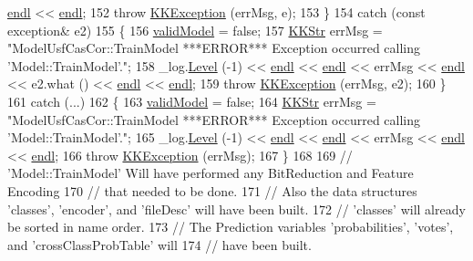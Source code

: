 \begin{DoxyCode}
      \hyperlink{namespace_k_k_b_ad1f50f65af6adc8fa9e6f62d007818a8}{endl} << \hyperlink{namespace_k_k_b_ad1f50f65af6adc8fa9e6f62d007818a8}{endl};
152     \textcolor{keywordflow}{throw}  \hyperlink{class_k_k_b_1_1_k_k_exception}{KKException} (errMsg, e);
153   \}
154   \textcolor{keywordflow}{catch} (\textcolor{keyword}{const} exception& e2)
155   \{
156     \hyperlink{class_k_k_m_l_l_1_1_model_af881a051b703412686fa3b4a62b6d68a}{validModel} = \textcolor{keyword}{false};
157     \hyperlink{class_k_k_b_1_1_k_k_str}{KKStr} errMsg = \textcolor{stringliteral}{"ModelUsfCasCor::TrainModel  ***ERROR*** Exception occurred calling
       'Model::TrainModel'."};
158     \_log.\hyperlink{class_k_k_b_1_1_run_log_a32cf761d7f2e747465fd80533fdbb659}{Level} (-1) << \hyperlink{namespace_k_k_b_ad1f50f65af6adc8fa9e6f62d007818a8}{endl} << \hyperlink{namespace_k_k_b_ad1f50f65af6adc8fa9e6f62d007818a8}{endl} << errMsg << \hyperlink{namespace_k_k_b_ad1f50f65af6adc8fa9e6f62d007818a8}{endl} << e2.what () << 
      \hyperlink{namespace_k_k_b_ad1f50f65af6adc8fa9e6f62d007818a8}{endl} << \hyperlink{namespace_k_k_b_ad1f50f65af6adc8fa9e6f62d007818a8}{endl};
159     \textcolor{keywordflow}{throw} \hyperlink{class_k_k_b_1_1_k_k_exception}{KKException} (errMsg, e2);
160   \}
161   \textcolor{keywordflow}{catch} (...)
162   \{
163     \hyperlink{class_k_k_m_l_l_1_1_model_af881a051b703412686fa3b4a62b6d68a}{validModel} = \textcolor{keyword}{false};
164     \hyperlink{class_k_k_b_1_1_k_k_str}{KKStr} errMsg = \textcolor{stringliteral}{"ModelUsfCasCor::TrainModel  ***ERROR*** Exception occurred calling
       'Model::TrainModel'."};
165     \_log.\hyperlink{class_k_k_b_1_1_run_log_a32cf761d7f2e747465fd80533fdbb659}{Level} (-1) << \hyperlink{namespace_k_k_b_ad1f50f65af6adc8fa9e6f62d007818a8}{endl} << \hyperlink{namespace_k_k_b_ad1f50f65af6adc8fa9e6f62d007818a8}{endl} << errMsg << \hyperlink{namespace_k_k_b_ad1f50f65af6adc8fa9e6f62d007818a8}{endl} << \hyperlink{namespace_k_k_b_ad1f50f65af6adc8fa9e6f62d007818a8}{endl};
166     \textcolor{keywordflow}{throw} \hyperlink{class_k_k_b_1_1_k_k_exception}{KKException} (errMsg);
167   \}
168 
169   \textcolor{comment}{// 'Model::TrainModel'  Will have performed any BitReduction and Feature Encoding }
170   \textcolor{comment}{// that needed to be done.  }
171   \textcolor{comment}{// Also the data structures 'classes', 'encoder', and 'fileDesc' will have been built.}
172   \textcolor{comment}{// 'classes' will already be sorted in name order.}
173   \textcolor{comment}{// The Prediction variables 'probabilities', 'votes', and 'crossClassProbTable' will}
174   \textcolor{comment}{// have been built.}

\end{DoxyCode}

